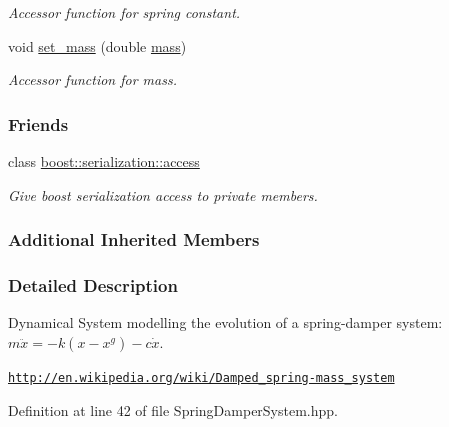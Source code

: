 \begin{DoxyCompactItemize}
\begin{DoxyCompactList}\small\item\em Accessor function for spring constant. \end{DoxyCompactList}\item 
void \hyperlink{classDmpBbo_1_1SpringDamperSystem_afd917e12a5f9a7131886704606f2fa44}{set\+\_\+mass} (double \hyperlink{classDmpBbo_1_1SpringDamperSystem_a387fcfdb067c6de3be9bfd61b868b839}{mass})
\begin{DoxyCompactList}\small\item\em Accessor function for mass. \end{DoxyCompactList}\end{DoxyCompactItemize}
\subsubsection*{Friends}
\begin{DoxyCompactItemize}
\item 
class \hyperlink{classDmpBbo_1_1SpringDamperSystem_ac98d07dd8f7b70e16ccb9a01abf56b9c}{boost\+::serialization\+::access}
\begin{DoxyCompactList}\small\item\em Give boost serialization access to private members. \end{DoxyCompactList}\end{DoxyCompactItemize}
\subsubsection*{Additional Inherited Members}


\subsubsection{Detailed Description}
Dynamical System modelling the evolution of a spring-\/damper system\+: $ m\ddot{x} = -k(x-x^g) -c\dot{x}$. 

\href{http://en.wikipedia.org/wiki/Damped_spring-mass_system}{\tt http\+://en.\+wikipedia.\+org/wiki/\+Damped\+\_\+spring-\/mass\+\_\+system} 

Definition at line 42 of file Spring\+Damper\+System.\+hpp.



